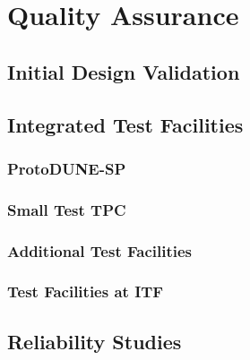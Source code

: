 \section{Quality Assurance}
\label{sec:fdsp-tpcelec-qa}

\subsection{Initial Design Validation}
\label{sec:fdsp-tpcelec-qa-initial}

\subsection{Integrated Test Facilities}
\label{sec:fdsp-tpcelec-qa-facilities}

\subsubsection{ProtoDUNE-SP}
\label{sec:fdsp-tpcelec-qa-facilities-pdune}

\subsubsection{Small Test TPC}
\label{sec:fdsp-tpcelec-qa-facilities-testtpc}

\subsubsection{Additional Test Facilities}
\label{sec:fdsp-tpcelec-qa-facilities-additional}

\subsubsection{Test Facilities at ITF}
\label{sec:fdsp-tpcelec-qa-facilities-itf}

\subsection{Reliability Studies}
\label{sec:fdsp-tpcelec-qa-reliability}
